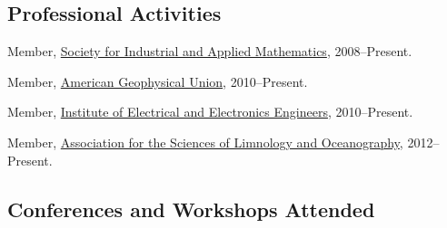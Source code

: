 \documentclass[10pt,letterpaper]{article}
\renewenvironment{itemize}{
  \begin{list}{}{
    \setlength{\leftmargin}{1.5em}
    \setlength{\itemsep}{0.25em}
    \setlength{\parskip}{0pt}
    \setlength{\parsep}{0.25em}
  }
}{
  \end{list}
}
\begin{document}
\subsection*{Professional Activities}

\begin{itemize}

\item Member, \href{http://www.siam.org/}{Society for Industrial and Applied Mathematics},
  2008--Present.

\item Member, \href{http://www.agu.org/}{American Geophysical Union},
  2010--Present.

\item Member, \href{http://www.ieee.org/}{Institute of Electrical and Electronics Engineers},
  2010--Present.

\item Member, \href{http://www.aslo.org/}{Association for the Sciences of Limnology and Oceanography},
  2012--Present.

%

\end{itemize}

\subsection*{Conferences and Workshops Attended}
\end{document}
